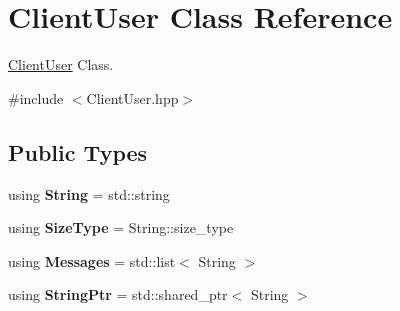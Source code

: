\hypertarget{classClientUser}{}\section{Client\+User Class Reference}
\label{classClientUser}


\hyperlink{classClientUser}{Client\+User} Class.  




{\ttfamily \#include $<$Client\+User.\+hpp$>$}

\subsection*{Public Types}
\begin{DoxyCompactItemize}
\item 
using {\bfseries String} = std\+::string\hypertarget{classClientUser_aef53757bf901527ea25271dcb6bb6f07}{}\label{classClientUser_aef53757bf901527ea25271dcb6bb6f07}

\item 
using {\bfseries Size\+Type} = String\+::size\+\_\+type\hypertarget{classClientUser_a7ae0fc0af4762d5ac0d62b2b74733d63}{}\label{classClientUser_a7ae0fc0af4762d5ac0d62b2b74733d63}

\item 
using {\bfseries Messages} = std\+::list$<$ String $>$\hypertarget{classClientUser_a7edc55abad1cbdfd2eb8ad58ca5a50b1}{}\label{classClientUser_a7edc55abad1cbdfd2eb8ad58ca5a50b1}

\item 
using {\bfseries String\+Ptr} = std\+::shared\+\_\+ptr$<$ String $>$\hypertarget{classClientUser_aa108f0bcb6ad6fa328b18e03e72acef5}{}\label{classClientUser_aa108f0bcb6ad6fa328b18e03e72acef5}

\end{DoxyCompactItemize}
